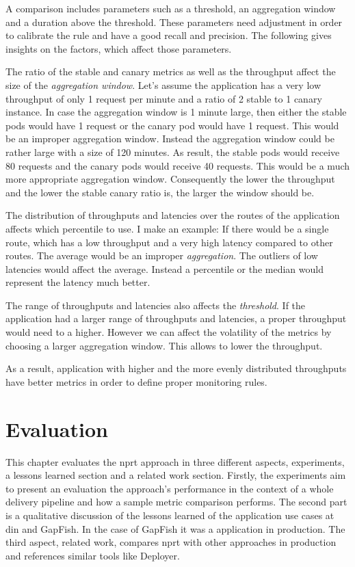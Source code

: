 A comparison includes parameters such as a threshold, an aggregation window and a duration
above the threshold. These parameters need adjustment in order to calibrate the rule and
have a good recall and precision. The following gives insights on the factors, which
affect those parameters.

The ratio of the stable and canary metrics as well as the throughput affect the size of
the \emph{aggregation window}. Let's assume the application has a very low throughput of
only 1 request per minute and a ratio of 2 stable to 1 canary instance. In case the
aggregation window is 1 minute large, then either the stable pods would have 1 request or
the canary pod would have 1 request. This would be an improper aggregation window. Instead
the aggregation window could be rather large with a size of 120 minutes. As result, the
stable pods would receive 80 requests and the canary pods would receive 40 requests. This
would be a much more appropriate aggregation window. Consequently the lower the throughput
and the lower the stable canary ratio is, the larger the window should be.

The distribution of throughputs and latencies over the routes of the application affects
which percentile to use. I make an example: If there would be a single route, which has a
low throughput and a very high latency compared to other routes. The average would be an
improper \emph{aggregation}. The outliers of low latencies would affect the
average. Instead a percentile or the median would represent the latency much better.

The range of throughputs and latencies also affects the \emph{threshold}. If the
application had a larger range of throughputs and latencies, a proper throughput would
need to a higher. However we can affect the volatility of the metrics by choosing a larger
aggregation window. This allows to lower the throughput.

As a result, application with higher and the more evenly distributed throughputs have
better metrics in order to define proper monitoring rules.

\chapter{Evaluation}
\label{chap:eval}

This chapter evaluates the \gls{nprt} approach in three different aspects, experiments, a
lessons learned section and a related work section. Firstly, the experiments aim to
present an evaluation the approach's performance in the context of a whole delivery
pipeline and how a sample metric comparison performs. The second part is a qualitative
discussion of the lessons learned of the application use cases at \gls{din} and GapFish.
In the case of GapFish it was a application in production. The third aspect, related work,
compares \gls{nprt} with other approaches in production and references similar tools like
Deployer.

